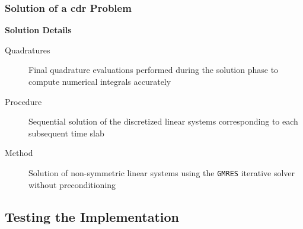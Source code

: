 \begin{frame}
\begin{multicols}{2}
        \vspace*{\fill}

    \end{multicols}
    \vspace*{\fill}
    
\end{frame}

\begin{frame}
    \frametitle{Solution of a \acrshort{cdr} Problem}

    \vspace*{\fill}
    \begin{center}
        {\color{\accentcolor} \Large \textbf{Solution Details}}
    \end{center}

    \vspace*{0.125cm}

    \begin{center}
        \begin{minipage}{0.75\textwidth}
            \begin{description}
                \item[Quadratures] Final quadrature evaluations performed during the solution phase to compute numerical integrals accurately
                \item[Procedure] Sequential solution of the discretized linear systems corresponding to each subsequent time slab
                \item[Method] Solution of non-symmetric linear systems using the \lstinline{GMRES} iterative solver without preconditioning
            \end{description}
        \end{minipage}
    \end{center}
    \vspace*{\fill}
    
\end{frame}

\subsection{Testing the Implementation}

